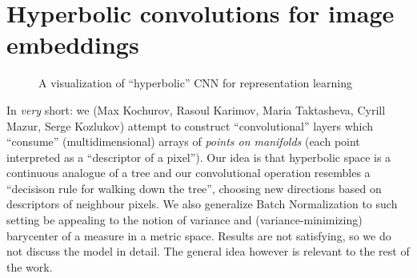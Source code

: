 \chapter{Hyperbolic convolutions for image embeddings} \label{appendix:hconv}

\begin{figure}[ht]\center
{}
\caption{A visualization of ``hyperbolic'' CNN for representation learning}
\end{figure}

In \emph{very} short: we (Max Kochurov, Rasoul Karimov, Maria Taktasheva,
Cyrill Mazur, Serge Kozlukov) attempt to construct ``convolutional'' layers
which ``consume'' (multidimensional) arrays of \emph{points on manifolds} (each
point interpreted as a ``descriptor of a pixel''). Our idea is that hyperbolic
space is a continuous analogue of a tree and our convolutional operation
resembles a ``decisison rule for walking down the tree'', choosing new
directions based on descriptors of neighbour pixels. We also generalize Batch
Normalization to such setting be appealing to the notion of variance and
(variance-minimizing) barycenter of a measure in a metric space. Results are
not satisfying, so we do not discuss the model in detail. The general idea
however is relevant to the rest of the work.
